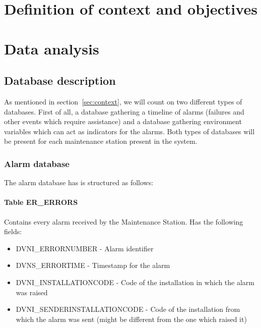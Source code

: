 \documentclass[a4paper,10pt]{book}
\begin{document}
\chapter{Definition of context and objectives}

\chapter{Data analysis}

\section{Database description}
As mentioned in section~\ref{sec:context}, we will count on two different types of databases. First of all, a database gathering a timeline of alarms (failures and other events which require assistance) and a database gathering environment variables which can act as indicators for the alarms. Both types of databases will be present for each maintenance station present in the system.

\subsection{Alarm database}
The alarm database has is structured as follows:
\subsubsection*{Table ER\_ERRORS}
Contains every alarm received by the Maintenance Station. Has the following fields:
\begin{itemize}
 \item DVNI\_ERRORNUMBER - Alarm identifier
 \item DVNS\_ERRORTIME - Timestamp for the alarm
 \item DVNI\_INSTALLATIONCODE - Code of the installation in which the alarm was raised
 \item DVNI\_SENDERINSTALLATIONCODE - Code of the installation from which the alarm was sent (might be different from the one which raised it)
\end{itemize}
\end{document}

